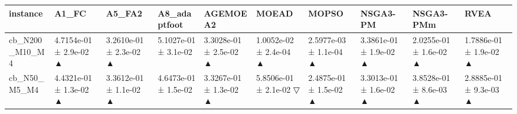 \begin{tabular}{llllllllll}
\toprule
instance & A1\_FC & A5\_FA2 & A8\_adaptfoot & AGEMOEA2 & MOEAD & MOPSO & NSGA3-PM & NSGA3-PMm & RVEA \\
\midrule
cb\_N200\_M10\_M4 & 4.7154e-01 ± 2.9e-02 ▲ & 3.2610e-01 ± 2.3e-02 ▲ & 5.1027e-01 ± 3.1e-02 & 3.3028e-01 ± 2.5e-02 ▲ & 1.0052e-02 ± 2.4e-04 ▲ & 2.5977e-03 ± 1.1e-04 ▲ & 3.3861e-01 ± 1.9e-02 ▲ & 2.0255e-01 ± 1.6e-02 ▲ & 1.7886e-01 ± 1.9e-02 ▲ \\
cb\_N50\_M5\_M4 & 4.4321e-01 ± 1.3e-02 ▲ & 3.3612e-01 ± 1.1e-02 ▲ & 4.6473e-01 ± 1.5e-02 & 3.3267e-01 ± 1.3e-02 ▲ & 5.8506e-01 ± 2.1e-02 ▽ & 2.4875e-01 ± 1.5e-02 ▲ & 3.3013e-01 ± 1.6e-02 ▲ & 3.8528e-01 ± 8.6e-03 ▲ & 2.8885e-01 ± 9.3e-03 ▲ \\
\bottomrule
\end{tabular}
